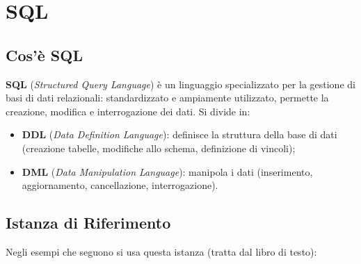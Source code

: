 \documentclass[12pt, a4paper]{article}
\begin{document}
\section{SQL}

\subsection{Cos'è SQL}

\textcolor{tocsec}{\textbf{SQL}} (\textit{Structured Query Language}) è un linguaggio specializzato per la gestione di basi di dati relazionali: standardizzato e ampiamente utilizzato, permette la creazione, modifica e interrogazione dei dati. Si divide in:
\begin{itemize}
    \item \textbf{DDL} (\textit{Data Definition Language}): definisce la struttura della base di dati (creazione tabelle, modifiche allo schema, definizione di vincoli);
    \item \textbf{DML} (\textit{Data Manipulation Language}): manipola i dati (inserimento, aggiornamento, cancellazione, interrogazione).
\end{itemize}

\subsection{Istanza di Riferimento}

Negli esempi che seguono si usa questa istanza (tratta dal libro di testo):
\end{document}
